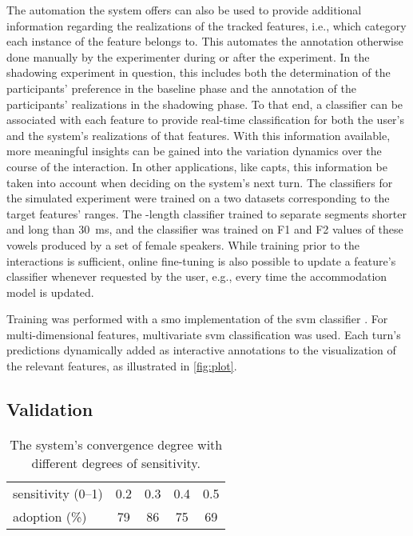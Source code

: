 The automation the system offers can also be used to provide additional information regarding the realizations of the tracked features, i.e., which category each instance of the feature belongs to.
This automates the annotation otherwise done manually by the experimenter during or after the experiment.
In the shadowing experiment in question, this includes both the determination of the participants' preference in the baseline phase and the annotation of the participants' realizations in the shadowing phase.
To that end, a classifier can be associated with each feature to provide real-time classification for both the user's and the system's realizations of that features.
With this information available, more meaningful insights can be gained into the variation dynamics over the course of the interaction.
In other applications, like \acp{capt}, this information be taken into account when deciding on the system's next turn.
The classifiers for the simulated experiment were trained on a two datasets corresponding to the target features' ranges.
The -length classifier trained to separate segments shorter and long than \SI{30}{\milli\second}, and the  classifier was trained on F1 and F2 values of these vowels produced by a set of female speakers.
While training prior to the interactions is sufficient, online fine-tuning is also possible to update a feature's classifier whenever requested by the user, e.g., every time the accommodation model is updated.

Training was performed with a \ac{smo} \citep{Platt1999fast, Platt1998sequential} implementation of the \ac{svm} classifier \citep{Vapnik1998support}.
For multi-dimensional features, multivariate \ac{svm} classification \citep[e.g.,][]{Joachims2005support} was used.
Each turn's predictions dynamically added as interactive annotations to the visualization of the relevant features, as illustrated in \cref{fig:plot}.

\subsection{Validation}
\label{subsec:validation}

\begin{table}[t]
	\centering
	\begin{tabularx}{\linewidth}{X*{4}{S[table-format=2.1]}}
		\toprule
		sensitivity (\numrange{0}{1}) &  0.2 &  0.3 &  0.4 &  0.5 \\
		adoption (\si{\percent})      & 79   & 86   & 75   & 69   \\
		\bottomrule
	\end{tabularx}
	\caption{The system's convergence degree with different degrees of sensitivity.}
	\label{tab:validation_baseline}
\end{table}

